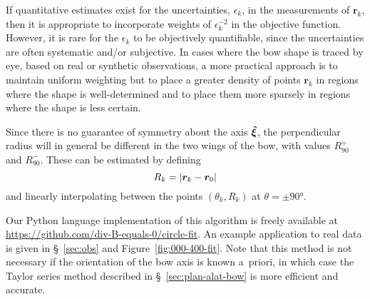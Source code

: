 If quantitative estimates exist for the uncertainties, \(\epsilon_k\), in the
measurements of \(\bm{r}_k\), then it is appropriate to incorporate
weights of \(\epsilon_k^{-2}\) in the objective function.  However, it is
rare for the \(\epsilon_k\) to be objectively quantifiable, since the
uncertainties are often systematic and/or subjective.  In cases
where the bow shape is traced by eye, based on real or synthetic
observations, a more practical approach is to maintain uniform
weighting but to place a greater density of points \(\bm{r}_k\) in
regions where the shape is well-determined and to place them more
sparsely in regions where the shape is less certain.

Since there is no guarantee of symmetry about the axis \(\bm{\hat{\xi}}\),
the perpendicular radius will in general be different in the two wings
of the bow, with values \(R_{90}^+\) and \(R_{90}^-\).  These can be
estimated by defining
\begin{equation}
  \label{eq:rcurv-R-k}
  R_k = \left\lvert\bm{r}_k - \bm{r}_0\right\rvert
\end{equation}
and linearly interpolating between the points \((\theta_k, R_k)\) at
\(\theta = \pm \ang{90}\).

Our Python language implementation of this algorithm is freely
available at \url{https://github.com/div-B-equals-0/circle-fit}.  An
example application to real data is given in \S~\ref{sec:obs} and
Figure~\ref{fig:000-400-fit}.  Note that this method is not necessary
if the orientation of the bow axis is known a~priori, in which case
the Taylor series method described in \S~\ref{sec:plan-alat-bow} is
more efficient and accurate.

